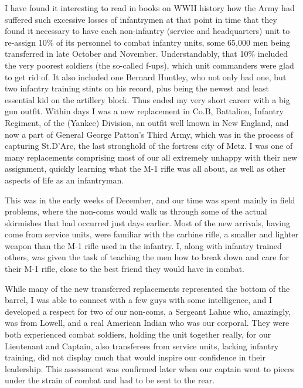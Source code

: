 \documentclass[../m3y]{subfiles}
\begin{document}
I have found it interesting to read in books on WW\thinspace II history how the Army had suffered such excessive losses of infantrymen at that point in time that they found it necessary to have each non-infantry (service and headquarters) unit to re-assign 10\% of its personnel to combat infantry units, some 65,000 men being transferred in late October and November. Understandably, that 10\% included the very poorest soldiers (the so-called f-ups), which unit commanders were glad to get rid of. It also included one Bernard Huntley, who not only had one, but two infantry training stints on his record, plus being the newest and least essential kid on the artillery block. Thus ended my very short career with a big gun outfit. Within days I was a new replacement in Co.\@ B,  Battalion,  Infantry Regiment, of the  (Yankee) Division, an outfit well known in New England, and now a part of General George Patton's Third Army, which was in the process of capturing St.\@ D'Arc, the last stronghold of the fortress city of Metz. I was one of many replacements comprising most of our all extremely unhappy with their new assignment, quickly learning what the M-1 rifle was all about, as well as other aspects of life as an infantryman.

This was in the early weeks of December, and our time was spent mainly in field problems, where the non-coms would walk us through some of the actual skirmishes that had occurred just days earlier. Most of the new arrivals, having come from service units, were familiar with the carbine rifle, a smaller and lighter weapon than the M-1 rifle used in the infantry. I, along with infantry trained others, was given the task of teaching the men how to break down and care for their M-1 rifle, close to the best friend they would have in combat.

While many of the new transferred replacements represented the bottom of the barrel, I was able to connect with a few guys with some intelligence, and I developed a respect for two of our non-coms, a Sergeant Lahue who, amazingly, was from Lowell, and a real American Indian who was our corporal. They were both experienced combat soldiers, holding the unit together really, for our Lieutenant and Captain, also transferees from service units, lacking infantry training, did not display much that would inspire our confidence in their leadership. This assessment was confirmed later when our captain went to pieces under the strain of combat and had to be sent to the rear.
\end{document}
